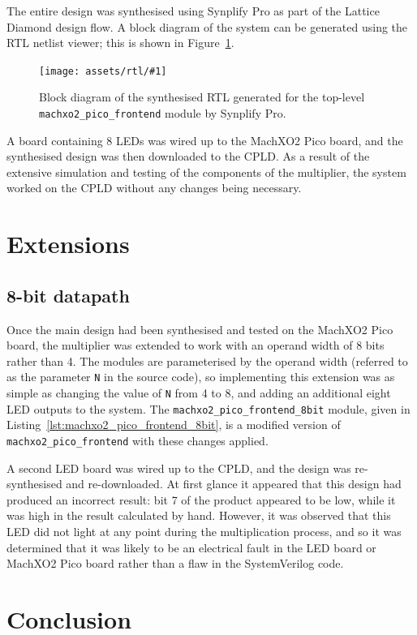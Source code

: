 \documentclass[a4paper]{article}
\newcommand{\rtlfigure}[2]{
  \begin{figure}[bp]
    \centering\texttt{[image: assets/rtl/\#1]}
    \caption{#2}
    \label{fig:rtl:#1}
  \end{figure}
}
\begin{document}
The entire design was synthesised using Synplify Pro as part of the Lattice Diamond design flow. A block diagram of the system can be generated using the RTL netlist viewer; this is shown in Figure~\ref{fig:rtl:machxo2_pico_frontend}.

\rtlfigure{machxo2_pico_frontend}{Block diagram of the synthesised RTL generated for the top-level \texttt{machxo2\_pico\_frontend} module by Synplify Pro.}

A board containing 8 LEDs was wired up to the MachXO2 Pico board, and the synthesised design was then downloaded to the CPLD. As a result of the extensive simulation and testing of the components of the multiplier, the system worked on the CPLD without any changes being necessary.

\section{Extensions}
\label{sec:ext}

\subsection{8-bit datapath}
\label{sec:ext:8bit}

Once the main design had been synthesised and tested on the MachXO2 Pico board, the multiplier was extended to work with an operand width of 8 bits rather than 4. The modules are parameterised by the operand width (referred to as the parameter \texttt{N} in the source code), so implementing this extension was as simple as changing the value of \texttt{N} from 4 to 8, and adding an additional eight LED outputs to the system. The \texttt{machxo2\_pico\_frontend\_8bit} module, given in Listing~\ref{lst:machxo2_pico_frontend_8bit}, is a modified version of \texttt{machxo2\_pico\_frontend} with these changes applied.

A second LED board was wired up to the CPLD, and the design was re-synthesised and re-downloaded. At first glance it appeared that this design had produced an incorrect result: bit 7 of the product appeared to be low, while it was high in the result calculated by hand. However, it was observed that this LED did not light at any point during the multiplication process, and so it was determined that it was likely to be an electrical fault in the LED board or MachXO2 Pico board rather than a flaw in the SystemVerilog code.

\section{Conclusion}
\label{sec:con}
\end{document}

